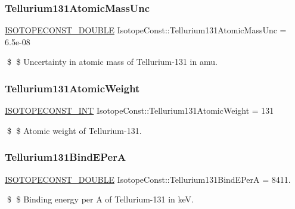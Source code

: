 \subsubsection{\texorpdfstring{Tellurium131\+Atomic\+Mass\+Unc}{Tellurium131AtomicMassUnc}}
{\footnotesize\ttfamily \mbox{\hyperlink{group___isotope_const-_macros_ga8f45a7272ce02c0b4c65c44636ed719a}{I\+S\+O\+T\+O\+P\+E\+C\+O\+N\+S\+T\+\_\+\+D\+O\+U\+B\+LE}} Isotope\+Const\+::\+Tellurium131\+Atomic\+Mass\+Unc = 6.\+5e-\/08}

\$ \$ Uncertainty in atomic mass of Tellurium-\/131 in amu. \mbox{\label{group___isotope_const-_tellurium-_te131_ga4e2f6746126c4d986cbc34f4a1d024c3}} 
\subsubsection{\texorpdfstring{Tellurium131\+Atomic\+Weight}{Tellurium131AtomicWeight}}
{\footnotesize\ttfamily \mbox{\hyperlink{group___isotope_const-_macros_ga5f18360b3e99483a35c32d789e62621c}{I\+S\+O\+T\+O\+P\+E\+C\+O\+N\+S\+T\+\_\+\+I\+NT}} Isotope\+Const\+::\+Tellurium131\+Atomic\+Weight = 131}

\$ \$ Atomic weight of Tellurium-\/131. \mbox{\label{group___isotope_const-_tellurium-_te131_ga37e149d98bade14192e730d5c8060f67}} 
\subsubsection{\texorpdfstring{Tellurium131\+Bind\+E\+PerA}{Tellurium131BindEPerA}}
{\footnotesize\ttfamily \mbox{\hyperlink{group___isotope_const-_macros_ga8f45a7272ce02c0b4c65c44636ed719a}{I\+S\+O\+T\+O\+P\+E\+C\+O\+N\+S\+T\+\_\+\+D\+O\+U\+B\+LE}} Isotope\+Const\+::\+Tellurium131\+Bind\+E\+PerA = 8411.}

\$ \$ Binding energy per A of Tellurium-\/131 in keV. \mbox{\label{group___isotope_const-_tellurium-_te131_ga34f0e8e7011495ce2024c457100c845f}} 
